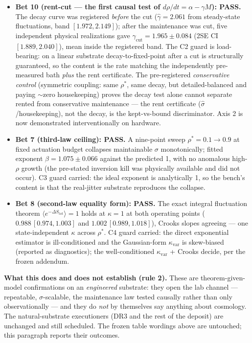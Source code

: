\documentclass[11pt,a4paper]{article}
\begin{document}
\begin{itemize}[leftmargin=*,itemsep=0.35em]
\item \textbf{Bet 10 (rent-cut --- the first causal test of $d\rho/dt = \alpha - \gamma M$): PASS.} The decay curve was registered \emph{before} the cut ($\hat\gamma = 2.061$ from steady-state fluctuations, band $[1.972, 2.149]$); after the maintenance was cut, five independent physical realizations gave $\gamma_{\text{cut}} = 1.965 \pm 0.084$ (2SE CI $[1.889, 2.040]$), mean inside the registered band. The C2 guard is load-bearing: on a linear substrate decay-to-fixed-point after a cut is structurally guaranteed, so the content is the rate matching the independently pre-measured bath \emph{plus} the rent certificate. The pre-registered \emph{conservative control} (symmetric coupling: same $\rho^*$, same decay, but detailed-balanced and paying $\sim$zero housekeeping) proves the decay test alone cannot separate rented from conservative maintenance --- the rent certificate ($\hat\sigma$/housekeeping), not the decay, is the kept-vs-bound discriminator. Axis 2 is now demonstrated interventionally on hardware.
\item \textbf{Bet 7 (third-law ceiling): PASS.} A nine-point sweep $\rho^* = 0.1 \to 0.9$ at fixed actuation budget collapses maintainable $\sigma$ monotonically; fitted exponent $\beta = 1.075 \pm 0.066$ against the predicted 1, with no anomalous high-$\rho$ growth (the pre-stated inversion kill was physically available and did not occur). C3 guard carried: the ideal exponent is analytically 1, so the bench's content is that the real-jitter substrate reproduces the collapse.
\item \textbf{Bet 8 (second-law equality form): PASS.} The exact integral fluctuation theorem $\langle e^{-\Delta S_{\text{tot}}}\rangle = 1$ holds at $\kappa = 1$ at both operating points ($0.988\,[0.974,1.003]$ and $1.002\,[0.989,1.018]$), Crooks slopes agreeing --- one state-independent $\kappa$ across $\rho^*$. C4 guard carried: the direct exponential estimator is ill-conditioned and the Gaussian-form $\kappa_{\text{var}}$ is skew-biased (reported as diagnostics); the well-conditioned $\kappa_{\text{var}}$ + Crooks decide, per the frozen addendum.
\end{itemize}
\textbf{What this does and does not establish (rule 2).} These are theorem-given-model confirmations on an \emph{engineered} substrate: they open the lab channel --- repeatable, $\sigma$-scalable, the maintenance law tested causally rather than only observationally --- and they do \emph{not} by themselves say anything about cosmology. The natural-substrate executioners (DR3 and the rest of the deposit) are unchanged and still scheduled. The frozen table wordings above are untouched; this paragraph reports their outcomes.
\end{document}
